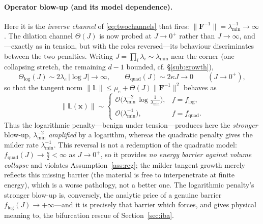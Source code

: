 \paragraph{Operator blow-up (and its model dependence).}
Here it is the \emph{inverse channel} of \eqref{eq:twochannels} that fires: $\|\bm{F}^{-1}\| = \lambda_{\min}^{-1} \to
    \infty$. The dilation channel $\Theta(J)$ is now probed at $J\to0^+$ rather than $J\to\infty$, and---exactly as in
tension, but with the roles reversed---its behaviour discriminates between the two penalties. Writing
$J=\prod_i\lambda_i\sim\lambda_{\min}$ near the corner (one collapsing stretch, the remaining $d-1$ bounded, cf.
\S\ref{sub:growth}),
\begin{equation}
    \label{eq:Thetacompress}
    \Theta_{\log}(J) \sim 2\lambda_e\,\big|\log J\big| \to \infty,
    \qquad
    \Theta_{\mathrm{quad}}(J) \sim 2\kappa J \to 0
    \qquad (J\to 0^+),
\end{equation}
so that the tangent norm $\|\mathbb{L}\|\le \mu_e + \Theta(J)\|\bm{F}^{-1}\|^2$ behaves as
\begin{equation}
    \label{eq:Lcompress}
    \| \mathbb{L}(\bm{x}) \| \sim
    \begin{cases}
        \mathcal{O}\!\big(\lambda_{\min}^{-2}\,\log\tfrac1{\lambda_{\min}}\big), & f=f_{\log},          \\[4pt]
        \mathcal{O}\!\big(\lambda_{\min}^{-1}\big),                              & f=f_{\mathrm{quad}}.
    \end{cases}
\end{equation}
Thus the logarithmic penalty---benign under tension---produces here the \emph{stronger} blow-up, $\lambda_{\min}^{-2}$
\emph{amplified} by a logarithm, whereas the quadratic penalty gives the milder rate $\lambda_{\min}^{-1}$. This
reversal is not a redemption of the quadratic model: $f_{\mathrm{quad}}(J)\to\tfrac{\kappa}{2}<\infty$ as $J\to0^+$, so
it provides \emph{no energy barrier against volume collapse} and violates Assumption~\ref{ass:reg}; the milder tangent
growth merely reflects this missing barrier (the material is free to interpenetrate at finite energy), which is a worse
pathology, not a better one. The logarithmic penalty's stronger blow-up is, conversely, the analytic price of a genuine
barrier $f_{\log}(J)\to+\infty$---and it is precisely that barrier which forces, and gives physical meaning to, the
bifurcation rescue of Section~\ref{sec:iba}.

